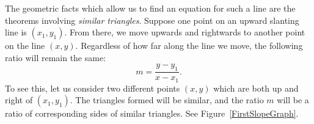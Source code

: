 The geometric facts which allow us to find an equation 
for such a line are the theorems involving {\it similar
triangles\footnotemark}.\label{SimilarTrianglesPage}
Suppose one point on an upward slanting line is $(x_1,y_1)$.
From there, we move upwards and rightwards to another
point on the line $(x,y)$.  Regardless of how far along
the line we move, the following ratio will remain the
same:
$$m=\frac{y-y_1}{x-x_1}.$$
To see this, let us consider two different points $(x,y)$
which are both up and right of $(x_1,y_1)$.
The triangles formed will be similar, and the ratio $m$ will
be a ratio of corresponding sides of similar triangles.
See Figure~\ref{FirstSlopeGraph}.
